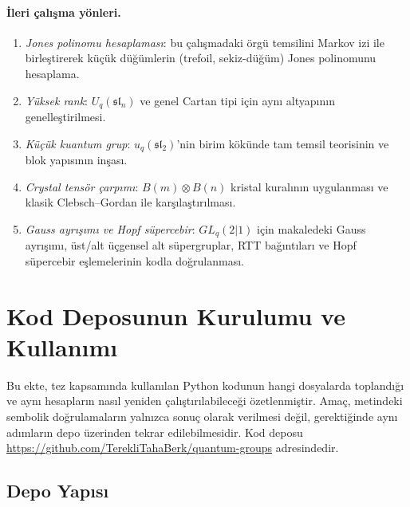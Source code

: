 \documentclass[10pt]{math}
\numberwithin{equation}{section}
\theoremstyle{plain}
\theoremstyle{definition}
\renewcommand{\sl}{\mathfrak{sl}}
\begin{document}
\paragraph{İleri çalışma yönleri.}
\begin{enumerate}[leftmargin=*]
  \item \emph{Jones polinomu hesaplaması}: bu çalışmadaki örgü temsilini Markov
        izi ile birleştirerek küçük düğümlerin (trefoil, sekiz-düğüm) Jones
        polinomunu hesaplama.
  \item \emph{Yüksek rank}: $U_q(\sl_n)$ ve genel Cartan tipi için aynı
        altyapının genelleştirilmesi.
  \item \emph{Küçük kuantum grup}: $u_q(\sl_2)$'nin birim kökünde tam
        temsil teorisinin ve blok yapısının inşası.
  \item \emph{Crystal tensör çarpımı}: $B(m) \otimes B(n)$ kristal
        kuralının uygulanması ve klasik Clebsch--Gordan ile karşılaştırılması.
  \item \emph{Gauss ayrışımı ve Hopf süpercebir}: $GL_q(2|1)$ için
        makaledeki Gauss ayrışımı, üst/alt üçgensel alt süpergruplar, RTT
        bağıntıları ve Hopf süpercebir eşlemelerinin kodla doğrulanması.
\end{enumerate}

\appendix
\section{Kod Deposunun Kurulumu ve Kullanımı}

Bu ekte, tez kapsamında kullanılan Python kodunun hangi dosyalarda toplandığı
ve aynı hesapların nasıl yeniden çalıştırılabileceği özetlenmiştir. Amaç,
metindeki sembolik doğrulamaların yalnızca sonuç olarak verilmesi değil,
gerektiğinde aynı adımların depo üzerinden tekrar edilebilmesidir. Kod deposu
\url{https://github.com/TerekliTahaBerk/quantum-groups} adresindedir.

\subsection{Depo Yapısı}
\end{document}
